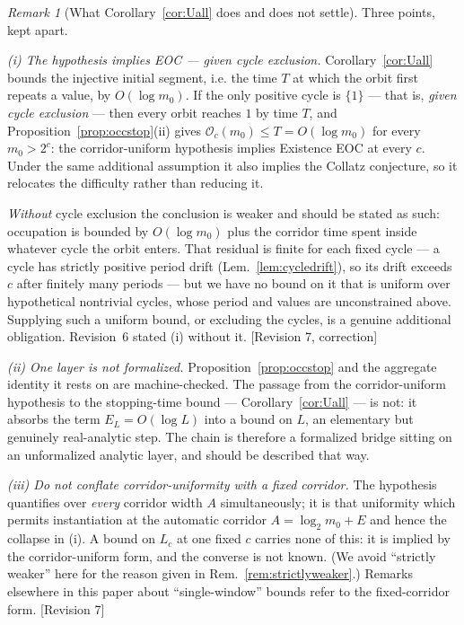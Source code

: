 \documentclass[11pt]{article}
\theoremstyle{plain}
\theoremstyle{definition}
\theoremstyle{remark}
\newtheorem{remark}[theorem]{Remark}
\newcommand{\Occ}{\mathcal{O}}
\newcommand{\status}[1]{\textsf{\footnotesize[#1]}}
\begin{document}
\begin{remark}[What Corollary~\ref{cor:Uall} does and does not settle]\label{rem:Uallscope}
Three points, kept apart.

\emph{(i) The hypothesis implies EOC --- given cycle exclusion.} Corollary~\ref{cor:Uall} bounds
the injective initial segment, i.e. the time $T$ at which the orbit first repeats a value, by
$O(\log m_0)$. If the only positive cycle is $\{1\}$ --- that is, \emph{given cycle exclusion} ---
then every orbit reaches $1$ by time $T$, and Proposition~\ref{prop:occstop}(ii) gives
$\Occ_c(m_0)\le T=O(\log m_0)$ for every $m_0>2^{c}$: the corridor-uniform hypothesis implies
Existence EOC at every $c$. Under the same additional assumption it also implies the Collatz
conjecture, so it relocates the difficulty rather than reducing it.

\emph{Without} cycle exclusion the conclusion is weaker and should be stated as such: occupation is
bounded by $O(\log m_0)$ plus the corridor time spent inside whatever cycle the orbit enters. That
residual is finite for each fixed cycle --- a cycle has strictly positive period drift
(Lem.~\ref{lem:cycledrift}), so its drift exceeds $c$ after finitely many periods --- but we have no
bound on it that is uniform over hypothetical nontrivial cycles, whose period and values are
unconstrained above. Supplying such a uniform bound, or excluding the cycles, is a genuine
additional obligation. Revision~6 stated (i) without it. \status{Revision 7, correction}

\emph{(ii) One layer is not formalized.} Proposition~\ref{prop:occstop} and the aggregate identity
it rests on are machine-checked. The passage from the corridor-uniform hypothesis to the
stopping-time bound --- Corollary~\ref{cor:Uall} --- is not: it absorbs the term
$E_L=O(\log L)$ into a bound on $L$, an elementary but genuinely real-analytic step. The chain is
therefore a formalized bridge sitting on an unformalized analytic layer, and should be described
that way.

\emph{(iii) Do not conflate corridor-uniformity with a fixed corridor.} The hypothesis quantifies
over \emph{every} corridor width $A$ simultaneously; it is that uniformity which permits
instantiation at the automatic corridor $A=\log_2m_0+E$ and hence the collapse in (i). A bound on
$L_c$ at one fixed $c$ carries none of this: it is implied by the corridor-uniform form, and the
converse is not known. (We avoid ``strictly weaker'' here for the reason given in
Rem.~\ref{rem:strictlyweaker}.) Remarks elsewhere
in this paper about ``single-window'' bounds refer to the fixed-corridor form.
\status{Revision 7}
\end{remark}
\end{document}
